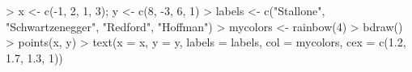 \begin{Schunk}
\begin{Sinput}
> x <- c(-1, 2, 1, 3); y <- c(8, -3, 6, 1)
> labels <- c("Stallone", "Schwartzenegger", "Redford", "Hoffman")
> mycolors <- rainbow(4)
> bdraw()
> points(x, y)
> text(x = x, y = y, labels = labels, col = mycolors, cex = c(1.2, 1.7, 1.3, 1))
\end{Sinput}
\end{Schunk}
